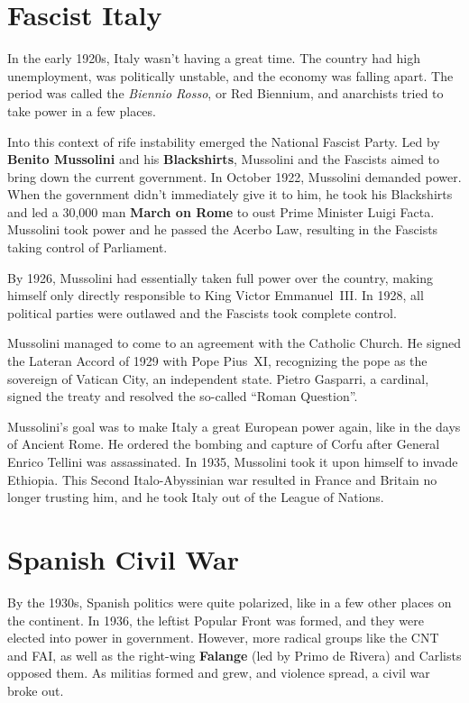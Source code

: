 \section{Fascist Italy}

In the early 1920s, Italy wasn't having a great time.
The country had high unemployment, was politically unstable, and the economy was falling apart.
The period was called the \textit{Biennio Rosso}, or Red Biennium,
and anarchists tried to take power in a few places.

Into this context of rife instability emerged the National Fascist Party.
Led by \textbf{Benito Mussolini} and his \textbf{Blackshirts},
Mussolini and the Fascists aimed to bring down the current government.
In October 1922, Mussolini demanded power.
When the government didn't immediately give it to him,
he took his Blackshirts and led a 30,000 man \textbf{March on Rome}
to oust Prime Minister Luigi Facta.
Mussolini took power and he passed the Acerbo Law,
resulting in the Fascists taking control of Parliament.

By 1926, Mussolini had essentially taken full power over the country,
making himself only directly responsible to King Victor Emmanuel~III\@.
In 1928, all political parties were outlawed and the Fascists took complete control.

Mussolini managed to come to an agreement with the Catholic Church.
He signed the Lateran Accord of 1929 with Pope Pius~XI,
recognizing the pope as the sovereign of Vatican City, an independent state.
Pietro Gasparri, a cardinal, signed the treaty and resolved the so-called ``Roman Question''.

Mussolini's goal was to make Italy a great European power again, like in the days of Ancient Rome.
He ordered the bombing and capture of Corfu after General Enrico Tellini was assassinated.
In 1935, Mussolini took it upon himself to invade Ethiopia.
This Second Italo-Abyssinian war resulted in France and Britain no longer trusting him,
and he took Italy out of the League of Nations.

\section{Spanish Civil War}

By the 1930s, Spanish politics were quite polarized, like in a few other places on the continent.
In 1936, the leftist Popular Front was formed, and they were elected into power in government.
However, more radical groups like the CNT and FAI,
as well as the right-wing \textbf{Falange} (led by Primo de Rivera) and Carlists opposed them.
As militias formed and grew, and violence spread, a civil war broke out.

